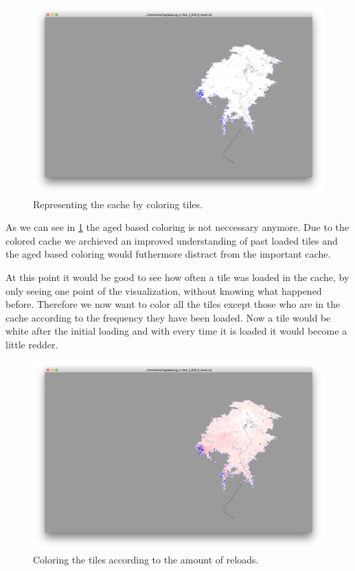 \documentclass
[
	paper = a4,
    pagesize,
	12 pt,
	oneside,                       %
    open = right,
	DIV = calc,
	BCOR = 0 mm,                   %
	bibtotoc
]
{scrbook}
\begin{document}
\begin{figure}[H]
	\includegraphics[width=\textwidth]{Images/vis-basic-cache.png}
\caption[]{Representing the cache by coloring tiles.}
\label{fig:cache_coloring}
\end{figure}


As we can see in \cref{fig:cache_coloring} the aged based coloring is not neccessary anymore. Due to the colored cache we archieved an improved understanding of past loaded tiles and the aged based coloring would futhermore distract from the important cache.

At this point it would be good to see how often a tile was loaded  in the cache, by only seeing one point of the visualization, without knowing what happened before.
Therefore we now want to color all the tiles except those who are in the cache according to the frequency they have been loaded.
Now a tile would be white after the initial loading and with every time it is loaded it would become a little redder.

\begin{figure}[H]
	\includegraphics[width=\textwidth]{Images/vis-rgb-cache.png}
\caption[]{Coloring the tiles according to the amount of reloads.}
\label{fig:reload_coloring_white}
\end{figure}
\end{document}
